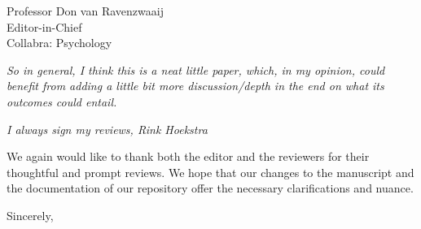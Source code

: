 \documentclass{stanfordletter}
\newcommand{\theysaid}[1]{\begin{leftbar} \noindent 
		\textsl{ #1}\end{leftbar}}
\begin{document}
\begin{letter}{Professor Don van Ravenzwaaij \\ Editor-in-Chief \\ Collabra: Psychology }
		\theysaid{So in general, I think this is a neat little paper, which, in my opinion, could benefit from adding a little bit more discussion/depth in the end on what its outcomes could entail.}
		
		\theysaid{I always sign my reviews,
		Rink Hoekstra}
		
		We again would like to thank both the editor and the reviewers for their thoughtful and prompt reviews. We hope that our changes to the manuscript and the documentation of our repository offer the necessary clarifications and nuance. 
		
		
          
          \closing{Sincerely,}
	\end{letter}
	
\end{document}
